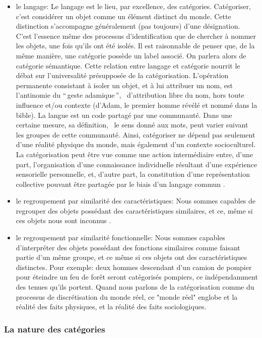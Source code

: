 \begin{itemize}

\item le langage: Le langage est le lieu, par excellence, des catégories. Catégoriser, c'est considérer un objet comme un élément distinct du monde. Cette distinction s'accompagne généralement (pas toujours) d'une désignation. C'est l'essence même des processus d'identification que de chercher à nommer les objets, une fois qu'ils ont été isolés. Il est raisonnable de penser que, de la même manière, une catégorie possède un label associé. On parlera alors de catégorie sémantique. Cette relation entre langage et catégorie nourrit le débat sur l'universalité présupposée de la catégorisation. L'opération permanente consistant à isoler un objet, et à lui attribuer un nom, est l'antinomie du ``\,geste adamique\,'', \ie~d'attribution libre du nom, hors toute influence et/ou contexte (d'Adam, le premier homme révélé et nommé dans la bible). La langue est un code partagé par une communauté. Dans une certaine mesure, sa définition, \ie~le sens donné aux mots, peut varier suivant les groupes de cette communauté. Ainsi, catégoriser ne dépend pas seulement d'une réalité physique du monde, mais également d'un contexte socioculturel. La catégorisation peut être vue comme une action intermédiaire entre, d'une part, l'organisation d'une connaissance individuelle résultant d'une expérience sensorielle personnelle, et, d'autre part, la constitution d'une représentation collective pouvant être partagée par le biais d'un langage commun \citep{dubois2006cognitive}.
\item le regroupement par similarité des caractéristiques: Nous sommes capables de regrouper des objets possédant des caractéristiques similaires, et ce, même si ces objets nous sont inconnus \citep{fried1984induction}.
\item le regroupement par similarité fonctionnelle: Nous sommes capables d'interpréter des objets possédant des fonctions similaires comme faisant partie d'un même groupe, et ce même si ces objets ont des caractéristiques distinctes. Pour exemple: deux hommes descendant d'un camion de pompier pour éteindre un feu de forêt seront catégorisés pompiers, ce indépendamment des tenues qu'ils portent. Quand nous parlons de la catégorisation comme du processus de discrétisation du monde réel, ce "monde réel" englobe et la réalité des faits physiques, et la réalité des faits sociologiques.
\end{itemize}

\subsubsection{La nature des catégories}

